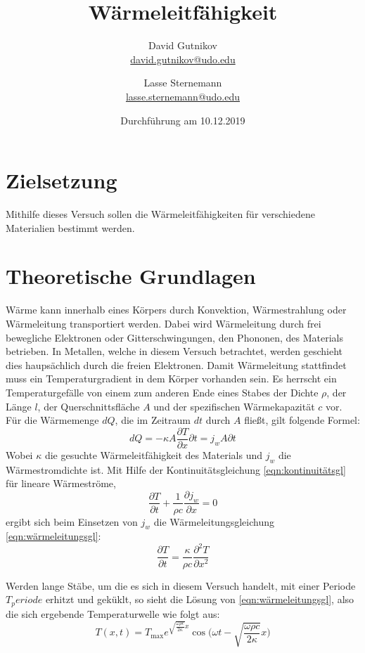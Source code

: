 \documentclass[titlepage = firstcover]{scrartcl}
\title{Wärmeleitfähigkeit}
\author{
  David Gutnikov\\
  \href{mailto:david.gutnikov@udo.edu}{david.gutnikov@udo.edu}
 \and 
  Lasse Sternemann\\
  \href{mailto:lasse.sternemann@udo.edu}{lasse.sternemann@udo.edu}
}
\date{Durchführung am 10.12.2019}
\begin{document}
  \maketitle
  \newpage
  \tableofcontents
  \newpage

  \section{Zielsetzung}
    Mithilfe dieses Versuch sollen die Wärmeleitfähigkeiten für verschiedene Materialien bestimmt werden.

  \section{Theoretische Grundlagen}
    Wärme kann innerhalb eines Körpers durch Konvektion, Wärmestrahlung oder Wärmeleitung transportiert werden.
    Dabei wird Wärmeleitung durch frei bewegliche Elektronen oder Gitterschwingungen, den Phononen, des Materials betrieben.
    In Metallen, welche in diesem Versuch betrachtet, werden geschieht dies haupsächlich durch die freien Elektronen.
    Damit Wärmeleitung stattfindet muss ein Temperaturgradient in dem Körper vorhanden sein.
    Es herrscht ein Temperaturgefälle von einem zum anderen Ende eines Stabes der Dichte $\rho$, der Länge $l$,
    der Querschnittsfläche $A$ und der spezifischen Wärmekapazität $c$ vor. Für die Wärmemenge $dQ$, die im Zeitraum $dt$
    durch $A$ fließt, gilt folgende Formel:
    \begin{equation}
      dQ = -\kappa A \frac{\partial T}{\partial x} \partial t = j_w A \partial t
    \end{equation}
    Wobei $\kappa$ die gesuchte Wärmeleitfähigkeit des Materials und $j_w$ die Wärmestromdichte ist.
    Mit Hilfe der Kontinuitätsgleichung \eqref{eqn:kontinuitätsgl} für lineare Wärmeströme,
    \begin{equation}
        \label{eqn:kontinuitätsgl}
      \frac{\partial T}{\partial t} + \frac{1}{\rho c} \frac{\partial j_w}{\partial x} = 0
    \end{equation}
    ergibt sich beim Einsetzen von $j_w$ die Wärmeleitungsgleichung \eqref{eqn:wärmeleitungsgl}:
    \begin{equation}
        \label{eqn:wärmeleitungsgl}
      \frac{\partial T}{\partial t} = \frac{\kappa}{\rho c} \frac{\partial^2 T}{\partial x^2}
    \end{equation}
    
    \noindent
    Werden lange Stäbe, um die es sich in diesem Versuch handelt, mit einer Periode $T_periode$ erhitzt und geküklt,
    so sieht die Lösung von \eqref{eqn:wärmeleitungsgl}, also die sich ergebende Temperaturwelle wie folgt aus:
    \begin{equation}
      T(x, t) = T_{\text{max}} e^{\sqrt{\frac{\omega \rho c}{2 \kappa}}x} \cos \biggl(\omega t - \sqrt{\frac{\omega \rho c}{2 \kappa}}x \biggr)
    \end{equation}
    \newpage
\end{document}
